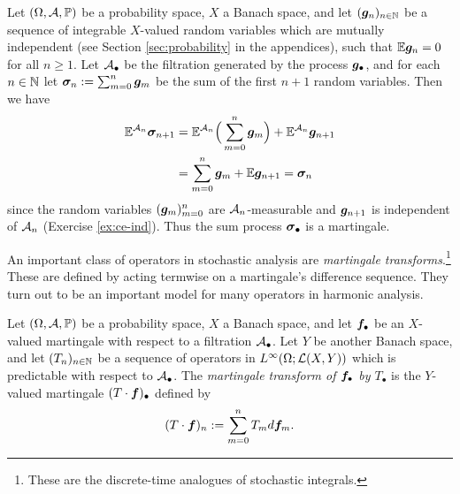 \begin{example}\label{eg:sum-process}
  Let $(\Omega, \mathcal{A}, \mathbb{P})$ be a probability space, $X$ a Banach space, and let $(\bm{g}_n)_{n \in \mathbb{N}}$ be a sequence of integrable $X$-valued random variables which are mutually independent (see Section \ref{sec:probability} in the appendices), such that $\mathbb{E}\bm{g}_{n} = 0$ for all $n \geq 1$.
  Let $\mathcal{A}_{\bullet}$ be the filtration generated by the process $\bm{g}_{\bullet}$, and for each $n \in \mathbb{N}$ let $\bm{\sigma}_n := \sum_{m=0}^n \bm{g}_m$ be the sum of the first $n+1$ random variables.
  Then we have
  \begin{equation*}
    \begin{aligned}
      \mathbb{E}^{\mathcal{A}_n} \bm{\sigma}_{n+1} &= \mathbb{E}^{\mathcal{A}_n}\Big( \sum_{m=0}^n\bm{g}_m \Big) + \mathbb{E}^{\mathcal{A}_n} \bm{g}_{n+1} \\
      &=\sum_{m=0}^n \bm{g}_m + \mathbb{E}\bm{g}_{n+1} = \bm{\sigma}_n
    \end{aligned}
  \end{equation*}
  since the random variables $(\bm{g}_m)_{m=0}^n$ are $\mathcal{A}_n$-measurable and $\bm{g}_{n+1}$ is independent of $\mathcal{A}_n$ (Exercise \ref{ex:ce-ind}).
  Thus the sum process $\bm{\sigma}_{\bullet}$ is a martingale.
\end{example}

An important class of operators in stochastic analysis are \emph{martingale transforms}.\footnote{These are the discrete-time analogues of stochastic integrals.}
These are defined by acting termwise on a martingale's difference sequence.
They turn out to be an important model for many operators in harmonic analysis.

\begin{defn}\label{dfn:mgale-transform}
  Let $(\Omega, \mathcal{A}, \mathbb{P})$ be a probability space, $X$ a Banach space, and let $\bm{f}_{\bullet}$ be an $X$-valued martingale with respect to a filtration $\mathcal{A}_{\bullet}$.
  Let $Y$ be another Banach space, and let $(T_n)_{n \in \mathbb{N}}$ be a sequence of operators in $L^\infty(\Omega; \mathcal{L}(X,Y))$ which is predictable with respect to $\mathcal{A}_{\bullet}$.
  The \emph{martingale transform of $\bm{f}_{\bullet}$ by $T_{\bullet}$} is the $Y$-valued martingale $(T \cdot \bm{f})_{\bullet}$ defined by
  \begin{equation*}
    (T \cdot \bm{f})_n := \sum_{m=0}^n T_m d\bm{f}_m.
  \end{equation*}
\end{defn}

